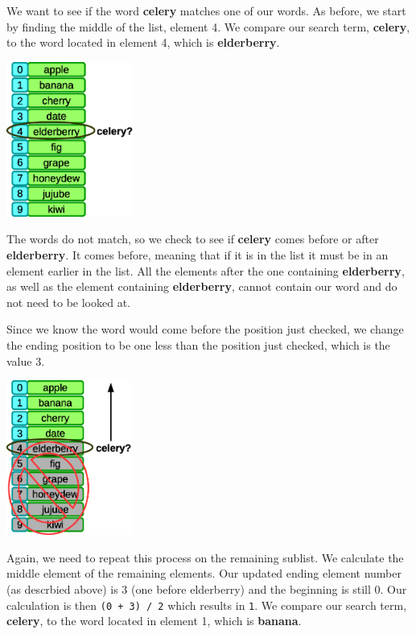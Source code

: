 We want to see if the word \textbf{celery} matches one of our words. As before, we start by finding the middle of the list, element 4. We compare our search term, \textbf{celery}, to the word located in element 4, which is \textbf{elderberry}.

\beforefig
\centerline{\includegraphics[height=2in]{figs2/recursion-binsearch-failure-1.eps}}
\afterfig

The words do not match, so we check to see if \textbf{celery} comes before or after \textbf{elderberry}. It comes before, meaning that if it is in the list it must be in an element earlier in the list. All the elements after the one containing \textbf{elderberry}, as well as the element containing \textbf{elderberry}, cannot contain our word and do not need to be looked at.

Since we know the word would come before the position just checked, we change the ending position to be one less than the position just checked, which is the value 3.

\beforefig
\centerline{\includegraphics[height=2in]{figs2/recursion-binsearch-failure-2.eps}}
\afterfig

Again, we need to repeat this process on the remaining sublist. We calculate the middle element of the remaining elements. Our updated ending element number (as descrbied above) is 3 (one before elderberry) and the beginning is still 0. Our calculation is then \texttt{(0 + 3) / 2} which results in \texttt{1}. We compare our search term, \textbf{celery}, to the word located in element 1, which is \textbf{banana}.

